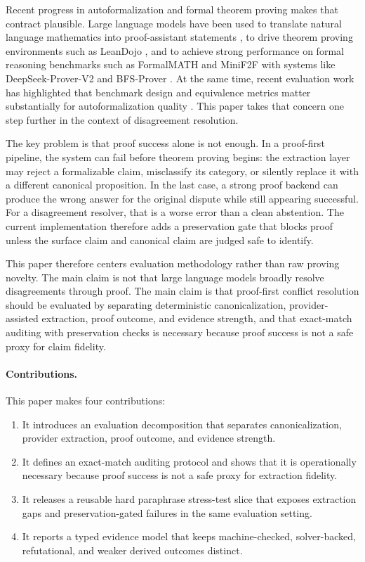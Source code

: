 \documentclass[11pt]{article}
\begin{document}
Recent progress in autoformalization and formal theorem proving makes that
contract plausible. Large language models have been used to translate natural
language mathematics into proof-assistant statements
\citep{wu2022autoformalization,azerbayev2023proofnet,zhang2025wild}, to drive
theorem proving environments such as LeanDojo \citep{yang2023leandojo}, and to
achieve strong performance on formal reasoning benchmarks such as FormalMATH
and MiniF2F with systems like DeepSeek-Prover-V2 and BFS-Prover
\citep{yu2025formalmath,ren2025deepseek,hsieh2025bfs}. At the same time,
recent evaluation work has highlighted that benchmark design and equivalence
metrics matter substantially for autoformalization quality
\citep{poiroux2025reliable,poiroux2025rlmeval}. This paper takes that concern
one step further in the context of disagreement resolution.

The key problem is that proof success alone is not enough. In a proof-first
pipeline, the system can fail before theorem proving begins: the extraction
layer may reject a formalizable claim, misclassify its category, or silently
replace it with a different canonical proposition. In the last case, a strong
proof backend can produce the wrong answer for the original dispute while still
appearing successful. For a disagreement resolver, that is a worse error than
a clean abstention. The current implementation therefore adds a preservation
gate that blocks proof unless the surface claim and canonical claim are judged
safe to identify.

This paper therefore centers evaluation methodology rather than raw proving
novelty. The main claim is not that large language models broadly resolve
disagreements through proof. The main claim is that proof-first conflict
resolution should be evaluated by separating deterministic canonicalization,
provider-assisted extraction, proof outcome, and evidence strength, and that
exact-match auditing with preservation checks is necessary because proof
success is not a safe proxy for claim fidelity.

\paragraph{Contributions.}
This paper makes four contributions:

\begin{enumerate}
  \item It introduces an evaluation decomposition that separates
  canonicalization, provider extraction, proof outcome, and evidence strength.
  \item It defines an exact-match auditing protocol and shows that it is
  operationally necessary because proof success is not a safe proxy for
  extraction fidelity.
  \item It releases a reusable hard paraphrase stress-test slice that exposes
  extraction gaps and preservation-gated failures in the same evaluation
  setting.
  \item It reports a typed evidence model that keeps machine-checked,
  solver-backed, refutational, and weaker derived outcomes distinct.
\end{enumerate}
\end{document}
